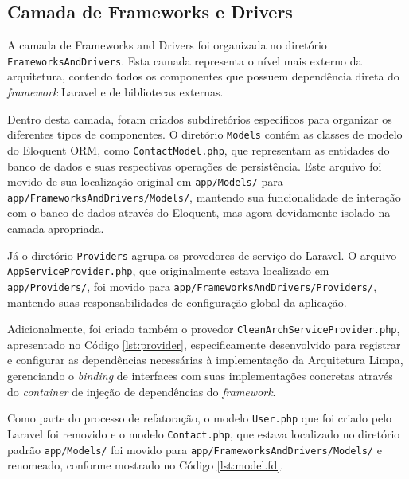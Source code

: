 \subsection{Camada de Frameworks e Drivers}
    
    \par A camada de Frameworks and Drivers foi organizada no diretório \texttt{FrameworksAndDrivers}. Esta camada representa o nível mais externo da arquitetura, contendo todos os componentes que possuem dependência direta do \textit{framework} Laravel e de bibliotecas externas.
    
    \par Dentro desta camada, foram criados subdiretórios específicos para organizar os diferentes tipos de componentes. O diretório \texttt{Models} contém as classes de modelo do Eloquent ORM, como \texttt{ContactModel.php}, que representam as entidades do banco de dados e suas respectivas operações de persistência. Este arquivo foi movido de sua localização original em \texttt{app/Models/} para  \texttt{app/FrameworksAndDrivers/Models/}, mantendo sua funcionalidade de interação com o banco de dados através do Eloquent, mas agora devidamente isolado na camada apropriada.
    
    \par Já o diretório \texttt{Providers} agrupa os provedores de serviço do Laravel. O arquivo \texttt{AppServiceProvider.php}, que originalmente estava localizado em \texttt{app/Providers/}, foi movido para \texttt{app/FrameworksAndDrivers/Providers/}, mantendo suas responsabilidades de configuração global da aplicação. 
    
    \par Adicionalmente, foi criado também o provedor \texttt{CleanArchServiceProvider.php}, apresentado no Código \ref{lst:provider}, especificamente desenvolvido para registrar e configurar as dependências necessárias à implementação da Arquitetura Limpa, gerenciando o \textit{binding} de interfaces com suas implementações concretas através do \textit{container} de injeção de dependências do \textit{framework}.

    

    
    \par Como parte do processo de refatoração, o modelo \texttt{User.php} que foi criado pelo Laravel foi removido e o modelo \texttt{Contact.php}, que estava localizado no diretório padrão \texttt{app/Models/} foi movido para \texttt{app/FrameworksAndDrivers/Models/} e renomeado, conforme mostrado no Código \ref{lst:model.fd}. 

